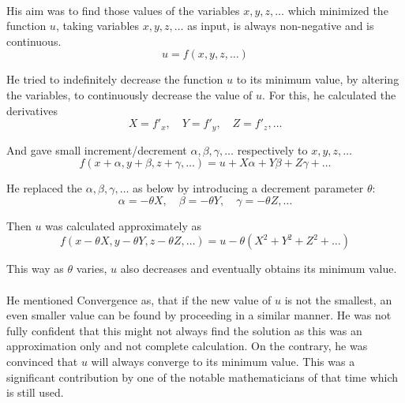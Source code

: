 \documentclass{article}
\begin{document}
    \paragraph{}
        His aim was to find those values of the variables $x,y,z, \ldots$ which minimized the function $u$, taking variables $x,y,z, \dots$ as input, is always non-negative and is continuous.
    \begin{equation*}
        u=f(x,y,z,\ldots)
    \end{equation*}

        He tried to indefinitely decrease the function $u$ to its minimum value, by altering the variables, to continuously decrease the value of $u$. For this, he calculated the derivatives 
    \begin{equation*}
        X = f'_{x}, \quad Y = f'_{y}, \quad Z = f'_{z}, \ldots
    \end{equation*}

        And gave small increment/decrement $\alpha, \beta, \gamma, \ldots$ respectively to $x,y,z, \ldots$
    \begin{equation*}
        f(x + \alpha, y + \beta, z + \gamma, \ldots) = u + X\alpha + Y\beta + Z\gamma + \ldots
    \end{equation*}

        He replaced the $\alpha, \beta, \gamma, \ldots$ as below by introducing a decrement parameter $\theta$:
        \begin{equation*}
            \alpha = -\theta X, \quad \beta = -\theta Y, \quad \gamma = -\theta Z, \ldots 
        \end{equation*}

        Then $u$ was calculated approximately as
        \begin{equation*}
            f(x - \theta X, y - \theta Y, z - \theta Z, \ldots) = u - \theta (X^2 + Y^2 + Z^2 + \ldots)
        \end{equation*}

        This way as $\theta$ varies, $u$ also decreases and eventually obtains its minimum value.

    \paragraph{}
        He mentioned Convergence as, that if the new value of $u$ is not the smallest, an even smaller value can be found by proceeding in a similar manner. He was not fully confident that this might not always find the solution as this was an approximation only and not complete calculation. 
        On the contrary, he was convinced that $u$ will always converge to its minimum value. This was a significant contribution by one of the notable mathematicians of that time which is still used. 


            

            

   
\end{document}
